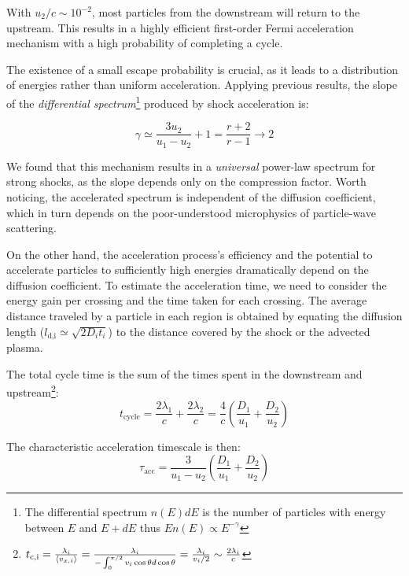 With \( u_2/c \sim 10^{-2} \), most particles from the downstream will return to the upstream. This results in a highly efficient first-order Fermi acceleration mechanism with a high probability of completing a cycle.

The existence of a small escape probability is crucial, as it leads to a distribution of energies rather than uniform acceleration. Applying previous results, the slope of the \emph{differential spectrum}\footnote{The differential spectrum \( n(E)dE \) is  the number of particles with energy between \( E \) and \( E + dE \) thus \( E n(E) \propto E^{-\gamma} \)} produced by shock acceleration is:
%
\begin{remark}
\begin{equation}
\gamma \simeq \frac{3 u_2}{u_1 - u_2} + 1 = \frac{r + 2}{r - 1} \rightarrow 2
\end{equation}
\end{remark}

We found that this mechanism results in a \emph{universal} power-law spectrum for strong shocks, as the slope depends only on the compression factor. Worth noticing, the accelerated spectrum is independent of the diffusion coefficient, which in turn depends on the poor-understood microphysics of particle-wave scattering.

On the other hand, the acceleration process's efficiency and the potential to accelerate particles to sufficiently high energies dramatically depend on the diffusion coefficient. 
%
To estimate the acceleration time, we need to consider the energy gain per crossing and the time taken for each crossing. %
The average distance traveled by a particle in each region is obtained by equating the diffusion length (\( l_{\text{d,i}} \simeq \sqrt{2 D_i t_i} \)) to the distance covered by the shock or the advected plasma.

The total cycle time is the sum of the times spent in the downstream and upstream\footnote{$
t_{\rm c, i} = \frac{\lambda_i}{\langle v_{x,i} \rangle} = \frac{\lambda_i}{-\int_0^{\pi/2} v_i \cos \theta d\cos\theta} = \frac{\lambda_i}{v_i / 2} \sim \frac{2\lambda_i}{c}$}:
%
\begin{equation}
t_{\text{cycle}} = \frac{2\lambda_1}{c} + \frac{2\lambda_2}{c} = \frac{4}{c} \left(\frac{D_1}{u_1} + \frac{D_2}{u_2}\right)
\end{equation}

The characteristic acceleration timescale is then:
%
\begin{equation}
\tau_{\text{acc}} = \frac{3}{u_1 - u_2} \left( \frac{D_1}{u_1} + \frac{D_2}{u_2} \right)
\end{equation}

